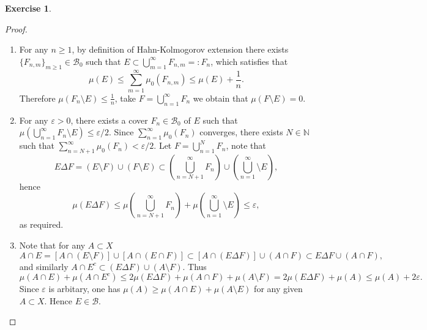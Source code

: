 \documentclass[a4paper]{article}
\newtheorem{ex}{Exercise}[subsection]
\begin{document}
\begin{ex}\end{ex}\begin{proof}\ 
\begin{enumerate}[label = (\roman*)]
    \item For any $n \geq 1$, by definition of Hahn-Kolmogorov extension there exists $\{F_{n, m}\}_{m \geq 1} \in \mathcal{B}_0$
    such that $E \subset \bigcup_{m = 1}^\infty F_{n, m} =: F_n$, which satisfies that $$
    \mu(E) \leq \sum_{m = 1}^\infty \mu_0(F_{n, m}) \leq \mu(E) + \frac{1}{n}.
    $$Therefore $\mu(F_n \setminus E) \leq \frac{1}{n}$, take $F = \bigcup_{n = 1}^\infty F_n$ we obtain that $\mu(F \setminus E) = 0$.
    \item For any $\varepsilon > 0$, there exists a cover $F_n \in \mathcal{B}_0$ of $E$ such that 
    $\mu(\bigcup_{n = 1}^\infty F_n \setminus E) \leq \varepsilon / 2$. Since $\sum_{n = 1}^\infty \mu_0(F_n)$ converges,
    there exists $N \in \mathbb{N}$ such that $\sum_{n = N + 1}^\infty \mu_0(F_n) < \varepsilon / 2$. Let $F = \bigcup_{n = 1}^N F_n$, 
    note that $$
    E \Delta F = (E \setminus F) \cup (F \setminus E) \subset (\bigcup_{n = N + 1}^\infty F_n) \cup (\bigcup_{n = 1}^\infty \setminus E),
    $$hence $$
    \mu(E \Delta F) \leq \mu(\bigcup_{n = N + 1}^\infty F_n) + \mu(\bigcup_{n = 1}^\infty \setminus E) \leq \varepsilon,
    $$as required.
    \item Note that for any $A \subset X$$$
    A \cap E = [A \cap (E \setminus F)] \cup [A \cap (E \cap F)] \subset [A \cap (E \Delta F)] \cup (A \cap F) \subset E \Delta F 
    \cup (A \cap F),
    $$and similarly $A \cap E^c \subset (E \Delta F) \cup (A \setminus F)$. Thus $$
    \mu(A \cap E) + \mu(A \cap E^c) \leq 2\mu(E \Delta F) + \mu(A \cap F) + \mu(A \setminus F) = 2\mu(E \Delta F) + \mu(A) \leq \mu(A) + 2\varepsilon.
    $$Since $\varepsilon$ is arbitary, one has $\mu(A) \geq \mu(A \cap E) + \mu(A \setminus E)$ for any given $A \subset X$.
    Hence $E \in \mathcal{B}$.
\end{enumerate}
\end{proof}
\end{document}
